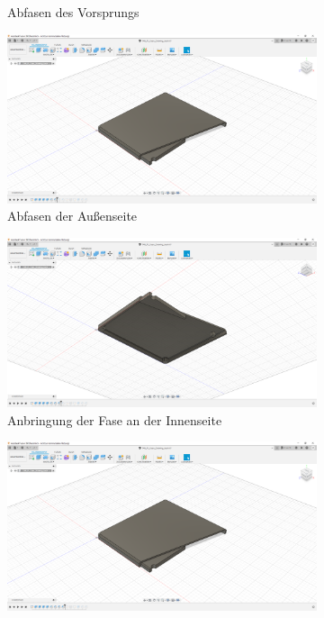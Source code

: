 \begin{figure}[H]
\begin{subfigure}[t]{.3\linewidth}
		\caption[Abfasen des Vorsprungs]{Abfasen des Vorsprungs}
		\label{fig:design-back-06}
	\end{subfigure}
	\begin{subfigure}[t]{.3\linewidth}
		\includegraphics[width=\linewidth]{img/konstruktion_gehaeuse_hinten_007.png}
		\caption[Abfasen der Außenseite]{Abfasen der Außenseite}
		\label{fig:design-back-07}
	\end{subfigure}
	\begin{subfigure}[t]{.3\linewidth}
		\includegraphics[width=\linewidth]{img/konstruktion_gehaeuse_hinten_008.png}
		\caption[Anbringung der Fase an der Innenseite]{Anbringung der Fase an der Innenseite}
		\label{fig:design-back-08}
	\end{subfigure}
	\begin{subfigure}[t]{.3\linewidth}
		\includegraphics[width=\linewidth]{img/konstruktion_gehaeuse_hinten_009.png}

\end{subfigure}
\end{figure}
